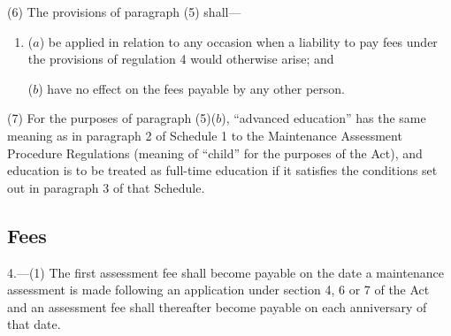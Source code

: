 \documentclass[12pt,a4paper]{article}
\begin{document}
(6) The provisions of paragraph (5) shall—
\begin{enumerate}\item[]
($a$) be applied in relation to any occasion when a liability to pay fees under the provisions of regulation 4 would otherwise arise; and

($b$) have no effect on the fees payable by any other person.
\end{enumerate}

(7) For the purposes of paragraph (5)($b$), “advanced education” has the same meaning as in paragraph 2 of Schedule 1 to the Maintenance Assessment Procedure Regulations (meaning of “child” for the purposes of the Act), and education is to be treated as full-time education if it satisfies the conditions set out in paragraph 3 of that Schedule.


\subsection[4. Fees]{Fees}

4.—(1) The first assessment fee shall become payable on the date a maintenance assessment is made following an application under section 4, 6 or 7 of the Act and an assessment fee shall thereafter become payable on each anniversary of that date.

\end{document}
